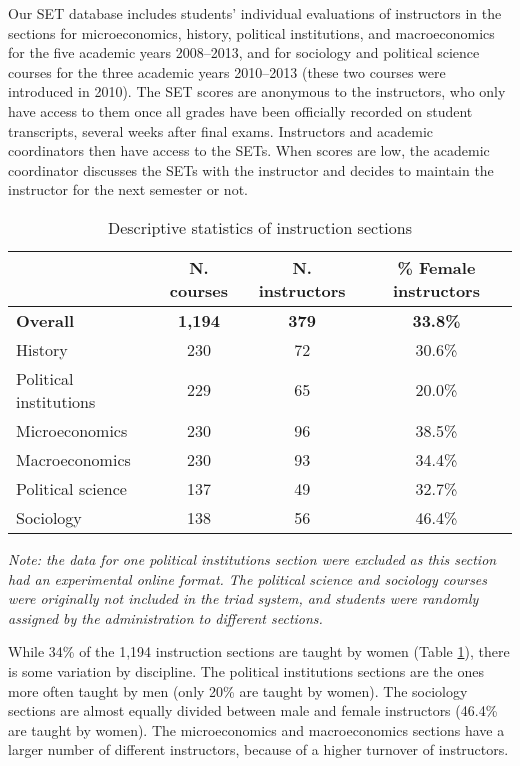 \documentclass[12pt]{article}
\begin{document}
Our SET database includes students' individual evaluations of instructors in the sections for microeconomics, history, political institutions, and macroeconomics for the five academic years 2008--2013, and for sociology and political science courses for the three academic years 2010--2013 
(these two courses were introduced in 2010). The SET scores are anonymous to the instructors, who only have access to them once all grades have been officially recorded on student transcripts, several weeks after final exams. Instructors and academic coordinators then have access to the SETs. When scores are low, the academic coordinator discusses the SETs with the instructor and decides to maintain the instructor for the next semester or not.   
 


\begin{table}[htbp]
  \centering
  \footnotesize 
  \caption{Descriptive statistics of instruction sections}
    \begin{tabular}{lccc}
    \toprule 
                        & N. courses & N. instructors  & \% Female instructors  \\
   \midrule
  \textbf{Overall} &  \textbf{1,194} & \textbf{379}  &\textbf{33.8\%} \\
    History    &               230 &      72          &   30.6\% \\
    Political institutions  &  229 &      65          &   20.0\% \\    
    Microeconomics   &         230 &      96          &   38.5\% \\
    Macroeconomics   &         230 &      93          &   34.4\% \\
    Political science &       137 &      49          &   32.7\% \\
    Sociology   &              138 &      56          &   46.4\%    \\
    \bottomrule
    \end{tabular}%
 \label{tab:description}%
 
\textit{Note: the data for one political institutions section were excluded as this section had an experimental online format. The political science and sociology courses were originally not included in the triad system, and students were randomly assigned by the administration to different sections.} 

\end{table}%
\normalsize

While 34\% of the 1,194 instruction sections are taught by women (Table \ref{tab:description}), there is some variation by discipline. The political institutions sections are the ones more often taught by men (only 20\% are taught by women). The sociology sections are almost equally divided between male and female instructors (46.4\% are taught by women). The microeconomics and macroeconomics sections have a larger number of different instructors, because of a higher turnover of instructors.   
\end{document}
